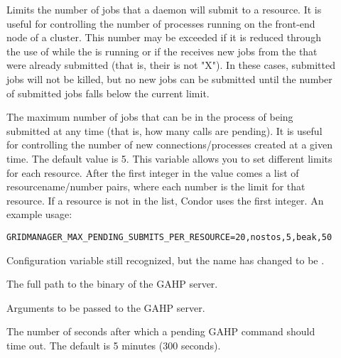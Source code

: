 \begin{description}
\item[]
\label{param:GridmanagerMaxSubmittedJobsPerResource}
Limits the number of jobs
that a  daemon will submit to a resource.
It is useful for controlling the number of 
processes running on the front-end node of a cluster.
This number may be exceeded if it is reduced through the use
of  while the  is running
or if the  receives new
jobs from the  that were already submitted
(that is, their  is not "X").
In these cases, submitted jobs will not be killed,
but no new jobs can be submitted until the number of submitted
jobs falls below the current limit.

\item[]
\label{param:GridmanagerMaxPendingSubmitsPerResource} The maximum
number of jobs
that can be in the process of being submitted at any time (that is,
how many  calls are pending).
It is useful for controlling the number of new
connections/processes created at a given time.
The default value is 5.
This variable allows
you to set different limits for each resource.
After the first integer in the value
comes a list of resourcename/number pairs,
where each number is the limit for that resource.
If a resource is not in the list,
Condor uses the first integer.
An example usage:
\begin{verbatim}
GRIDMANAGER_MAX_PENDING_SUBMITS_PER_RESOURCE=20,nostos,5,beak,50
\end{verbatim}

\item[]
\label{param:GridmanagerMaxPendingSubmits} Configuration variable
still recognized, but the name has changed to be
.

\item[]
\label{param:Gahp} The full path to the binary of the GAHP server.

\item[]
\label{param:GahpArgs} Arguments to be passed to the GAHP server.

\item[]
\label{param:GridmanagerGahpCallTimeout} The number of seconds after
which a pending GAHP command should time out. The default is 5 minutes
(300 seconds).


\end{description}
